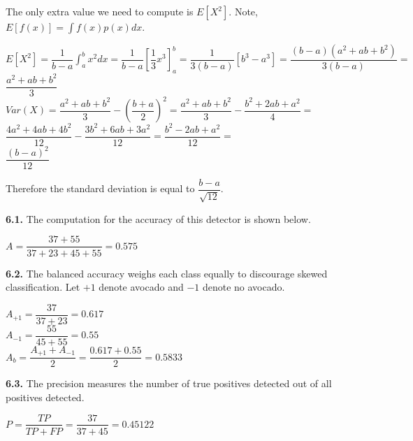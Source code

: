 \documentclass[12pt]{article}
\begin{document}
The only extra value we need to compute is $E[X^{2}]$. Note, $E[f(x)]=\displaystyle\int f(x)p(x)dx$.

\begin{center}

$E[X^{2}]=\dfrac{1}{b-a}\displaystyle\int_{a}^{b}x^{2}dx=\dfrac{1}{b-a}[\dfrac{1}{3}x^{3}]_{a}^{b}=\dfrac{1}{3(b-a)}[b^{3}-a^{3}]=\dfrac{(b-a)(a^{2}+ab+b^{2})}{3(b-a)}=$\\
\bigskip
$\dfrac{a^{2}+ab+b^{2}}{3}$\\
\bigskip
$Var(X)=\dfrac{a^{2}+ab+b^{2}}{3}-(\dfrac{b+a}{2})^{2}=\dfrac{a^{2}+ab+b^{2}}{3}-\dfrac{b^{2}+2ab+a^{2}}{4}=$\\
\bigskip
$\dfrac{4a^{2}+4ab+4b^{2}}{12}-\dfrac{3b^{2}+6ab+3a^{2}}{12}=\dfrac{b^{2}-2ab+a^{2}}{12}=$\\
\bigskip
$\dfrac{(b-a)^{2}}{12}$\\

\end{center}

Therefore the standard deviation is equal to $\dfrac{b-a}{\sqrt{12}}$. 

{\bf 6.1.} The computation for the accuracy of this detector is shown below.

\begin{center}

$A=\dfrac{37+55}{37+23+45+55}=0.575$\\

\end{center}

{\bf 6.2.} The balanced accuracy weighs each class equally to discourage skewed classification. Let $+1$ denote avocado and $-1$ denote no avocado.

\begin{center}

$A_{+1}=\dfrac{37}{37+23}=0.617$\\
\bigskip
$A_{-1}=\dfrac{55}{45+55}=0.55$\\
\bigskip
$A_{b}=\dfrac{A_{+1}+A_{-1}}{2}=\dfrac{0.617+0.55}{2}=0.5833$\\

\end{center}

{\bf 6.3.} The precision measures the number of true positives detected out of all positives detected.

\begin{center}

$P=\dfrac{TP}{TP+FP}=\dfrac{37}{37+45}=0.45122$\\

\end{center}
\end{document}
